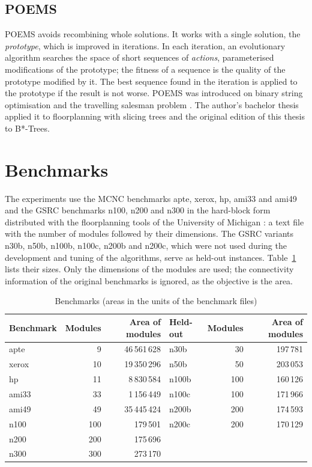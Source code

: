 \subsection{POEMS}

POEMS \cite{poems} avoids recombining whole solutions. It works with a single solution, the {\em prototype}, which is improved in iterations. In each iteration, an evolutionary algorithm searches the space of short sequences of {\em actions}, parameterised modifications of the prototype; the fitness of a sequence is the quality of the prototype modified by it. The best sequence found in the iteration is applied to the prototype if the result is not worse. POEMS was introduced on binary string optimisation and the travelling salesman problem \cite{poems}. The author's bachelor thesis \cite{vh} applied it to floorplanning with slicing trees and the original edition of this thesis to B*-Trees.

\section{Benchmarks}

The experiments use the MCNC benchmarks apte, xerox, hp, ami33 and ami49 and the GSRC benchmarks n100, n200 and n300 in the hard-block form distributed with the floorplanning tools of the University of Michigan \cite{bench}: a text file with the number of modules followed by their dimensions. The GSRC variants n30b, n50b, n100b, n100c, n200b and n200c, which were not used during the development and tuning of the algorithms, serve as held-out instances. Table~\ref{tab:benchmarks} lists their sizes. Only the dimensions of the modules are used; the connectivity information of the original benchmarks is ignored, as the objective is the area.

\begin{table}
\centering
\begin{tabular}{@{}lrr|lrr@{}}
\toprule
Benchmark & Modules & Area of modules & Held-out & Modules & Area of modules \\
\midrule
apte & 9 & 46\,561\,628 & n30b & 30 & 197\,781 \\
xerox & 10 & 19\,350\,296 & n50b & 50 & 203\,053 \\
hp & 11 & 8\,830\,584 & n100b & 100 & 160\,126 \\
ami33 & 33 & 1\,156\,449 & n100c & 100 & 171\,966 \\
ami49 & 49 & 35\,445\,424 & n200b & 200 & 174\,593 \\
n100 & 100 & 179\,501 & n200c & 200 & 170\,129 \\
n200 & 200 & 175\,696 & & & \\
n300 & 300 & 273\,170 & & & \\
\bottomrule
\end{tabular}
\caption{Benchmarks (areas in the units of the benchmark files)}
\label{tab:benchmarks}
\end{table}
